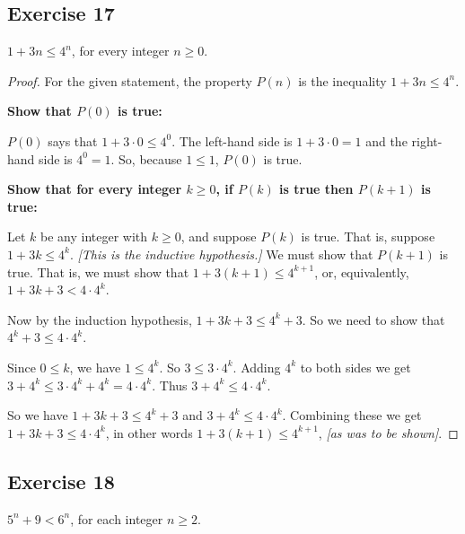 \documentclass[14pt]{extarticle}
\begin{document}
\subsection{Exercise 17}
$1 + 3n \leq 4^n$, for every integer $n \geq 0$.

\begin{proof}
For the given statement, the property $P(n)$ is the inequality $1 + 3n \leq 4^n$. 

{\bf Show that $P(0)$ is true:} 

$P(0)$ says that $1 + 3 \cdot 0 \leq 4^0$. The left-hand side is $1 + 3 \cdot 0 = 1$ and the right-hand side is $4^0 = 1$. So, because $1 \leq 1$, $P(0)$ is true. 

{\bf Show that for every integer $k \geq 0$, if $P(k)$ is true then $P(k + 1)$ is true:} 

Let $k$ be any integer with $k \geq 0$, and suppose $P(k)$ is true. That is, suppose $1 + 3k \leq 4^k$. {\it [This is the inductive hypothesis.]} We must show that $P(k + 1)$ is true. That is, we must show that $1 + 3(k+1) \leq 4^{k+1}$, or, equivalently, $1+3k+3 < 4 \cdot 4^k$. 

Now by the induction hypothesis, $1 + 3k + 3 \leq 4^k + 3$. So we need to show that $4^k + 3 \leq 4 \cdot 4^k$.

Since $0 \leq k$, we have $1 \leq 4^k$. So $3 \leq 3 \cdot 4^k$. Adding $4^k$ to both sides we get $3 + 4^k \leq 3 \cdot 4^k + 4^k = 4 \cdot 4^k$. Thus $3 + 4^k \leq 4 \cdot 4^k$.

So we have $1 + 3k + 3 \leq 4^k + 3$ and $3 + 4^k \leq 4 \cdot 4^k$. Combining these we get $1 + 3k + 3 \leq 4 \cdot 4^k$, in other words $1 + 3(k+1) \leq 4^{k+1}$, {\it [as was to be shown]}.
\end{proof}

\subsection{Exercise 18}
$5^n + 9 < 6^n$, for each integer $n \geq 2$.
\end{document}
